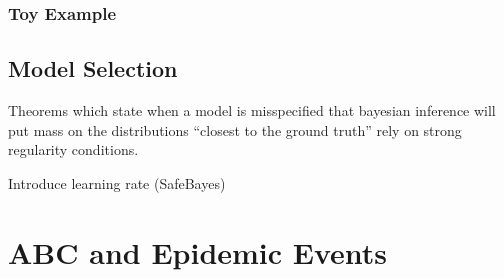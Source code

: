 \documentclass[11pt,a4paper,margin=0]{article}
\theoremstyle{break}
\begin{document}
\subsubsection*{Toy Example}

\subsection{Model Selection}

  \par Theorems which state when a model is misspecified that bayesian inference will put mass on the distributions ``closest to the ground truth'' rely on strong regularity conditions. \cite[]{inconsistency_of_bayesian_inference_for_misspecified_linear_models_and_a_proposal_for_reparing_it}
  \par Introduce learning rate (SafeBayes) \cite[]{inconsistency_of_bayesian_inference_for_misspecified_linear_models_and_a_proposal_for_reparing_it}

\newpage
\section{ABC and Epidemic Events}\label{sec_epidemic_events}

\newpage


\end{document}
